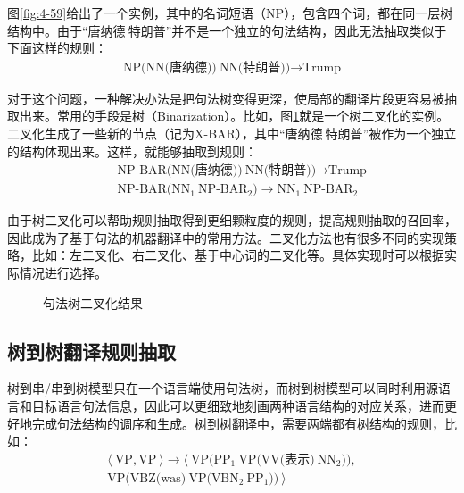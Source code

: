 \parinterval 图\ref{fig:4-59}给出了一个实例，其中的名词短语（NP），包含四个词，都在同一层树结构中。由于``唐纳德$\ $特朗普''并不是一个独立的句法结构，因此无法抽取类似于下面这样的规则：
\begin{eqnarray}
\textrm{NP(NN(唐纳德))}\ \textrm{NN(特朗普))} \rightarrow \textrm{Trump} \nonumber
\end{eqnarray}

\parinterval 对于这个问题，一种解决办法是把句法树变得更深，使局部的翻译片段更容易被抽取出来。常用的手段是树{\small{}}（Binarization）。比如，图\ref{fig:4-60}就是一个树二叉化的实例。二叉化生成了一些新的节点（记为X-BAR），其中``唐纳德$\ $特朗普''被作为一个独立的结构体现出来。这样，就能够抽取到规则：
\begin{eqnarray}
&& \textrm{NP-BAR(NN(唐纳德))}\ \textrm{NN(特朗普))} \rightarrow \textrm{Trump} \nonumber \\
&& \textrm{NP-BAR(}\textrm{NN}_1\ \textrm{NP-}\textrm{BAR}_2) \rightarrow \textrm{NN}_1\ \textrm{NP-}\textrm{BAR}_2 \nonumber
\end{eqnarray}

\parinterval 由于树二叉化可以帮助规则抽取得到更细颗粒度的规则，提高规则抽取的召回率，因此成为了基于句法的机器翻译中的常用方法。二叉化方法也有很多不同的实现策略，比如：左二叉化\cite{DBLP:conf/naacl/ZhangHGK06}、右二叉化\cite{Tong2009Better}、基于中心词的二叉化\cite{DBLP:conf/acl/KleinM03,charniak2006multilevel}等。具体实现时可以根据实际情况进行选择。

\begin{figure}[htp]
\centering

\caption{句法树二叉化结果}
\label{fig:4-60}
\end{figure}


\subsection{树到树翻译规则抽取}

\parinterval 树到串/串到树模型只在一个语言端使用句法树，而树到树模型可以同时利用源语言和目标语言句法信息，因此可以更细致地刻画两种语言结构的对应关系，进而更好地完成句法结构的调序和生成。树到树翻译中，需要两端都有树结构的规则，比如：
\begin{eqnarray}
\langle\ \textrm{VP},\textrm{VP}\ \rangle \rightarrow \langle\ \textrm{VP(}\textrm{PP}_1\ \textrm{VP(VV(表示)}\ \textrm{NN}_2\textrm{))}, \nonumber \\
\textrm{VP(VBZ(was)}\ \textrm{VP(}\textrm{VBN}_2\ \textrm{PP}_1\textrm{))}\ \rangle \nonumber
\end{eqnarray}


